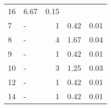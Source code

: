 \begin{longtable}{lXrrr}
       \num{16} &
       \num[round-mode=places,round-precision=2]{6.67} &
         \num[round-mode=places,round-precision=2]{0.15} \\

     7 &
     \multicolumn{1}{X}{ -  } &


       \num{1} &
       \num[round-mode=places,round-precision=2]{0.42} &
         \num[round-mode=places,round-precision=2]{0.01} \\

     8 &
     \multicolumn{1}{X}{ -  } &


       \num{4} &
       \num[round-mode=places,round-precision=2]{1.67} &
         \num[round-mode=places,round-precision=2]{0.04} \\

     9 &
     \multicolumn{1}{X}{ -  } &


       \num{1} &
       \num[round-mode=places,round-precision=2]{0.42} &
         \num[round-mode=places,round-precision=2]{0.01} \\

     10 &
     \multicolumn{1}{X}{ -  } &


       \num{3} &
       \num[round-mode=places,round-precision=2]{1.25} &
         \num[round-mode=places,round-precision=2]{0.03} \\

     12 &
     \multicolumn{1}{X}{ -  } &


       \num{1} &
       \num[round-mode=places,round-precision=2]{0.42} &
         \num[round-mode=places,round-precision=2]{0.01} \\

     14 &
     \multicolumn{1}{X}{ -  } &


       \num{1} &
       \num[round-mode=places,round-precision=2]{0.42} &
         \num[round-mode=places,round-precision=2]{0.01} \\


\end{longtable}
